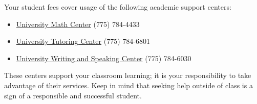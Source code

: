 Your student fees cover usage of the following academic support centers:
\begin{itemize}
	\item \href{https://www.unr.edu/university-math-center}{University Math Center} (775) 784-4433
	\item \href{https://www.unr.edu/tutoring-center}{University Tutoring Center} (775) 784-6801
	\item \href{https://www.unr.edu/writing-speaking-center}{University Writing and Speaking Center} (775) 784-6030
\end{itemize}
These centers support your classroom learning; it is your responsibility to take
advantage of their services. Keep in mind that seeking help outside of class is a
sign of a responsible and successful student.
